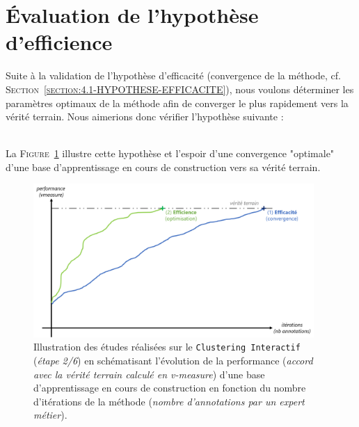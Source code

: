 \section{Évaluation de l'hypothèse d'efficience}
\label{section:4.2-HYPOTHESE-EFFICIENCE}

	Suite à la validation de l'hypothèse d'efficacité (convergence de la méthode, cf. \textsc{Section~\ref{section:4.1-HYPOTHESE-EFFICACITE}}), nous voulons déterminer les paramètres optimaux de la méthode afin de converger le plus rapidement vers la vérité terrain.
	Nous aimerions donc vérifier l'hypothèse suivante :

	\begin{tcolorbox}[
		title=\faVial~\textbf{Hypothèse d'efficience}~\faVial,
		colback=colorTcolorboxHypothesis!15,
		colframe=colorTcolorboxHypothesis!75,
		width=\linewidth
	]

		 \\
		
		La \textsc{Figure~\ref{figure:4.2-HYPOTHESE-EFFICIENCE}} illustre cette hypothèse et l'espoir d'une convergence "optimale" d'une base d'apprentissage en cours de construction vers sa vérité terrain.
		\begin{figure}[H]  %
			\centering
			\includegraphics[width=0.95\textwidth]{figures/hypotheses-02-efficience}
			\caption{
				Illustration des études réalisées sur le \texttt{Clustering Interactif} (\textit{étape 2/6}) en schématisant l'évolution de la performance (\textit{accord avec la vérité terrain calculé en v-measure}) d'une base d'apprentissage en cours de construction en fonction du nombre d'itérations de la méthode (\textit{nombre d'annotations par un expert métier}).
			}
			\label{figure:4.2-HYPOTHESE-EFFICIENCE}
		\end{figure}
	\end{tcolorbox}
	

